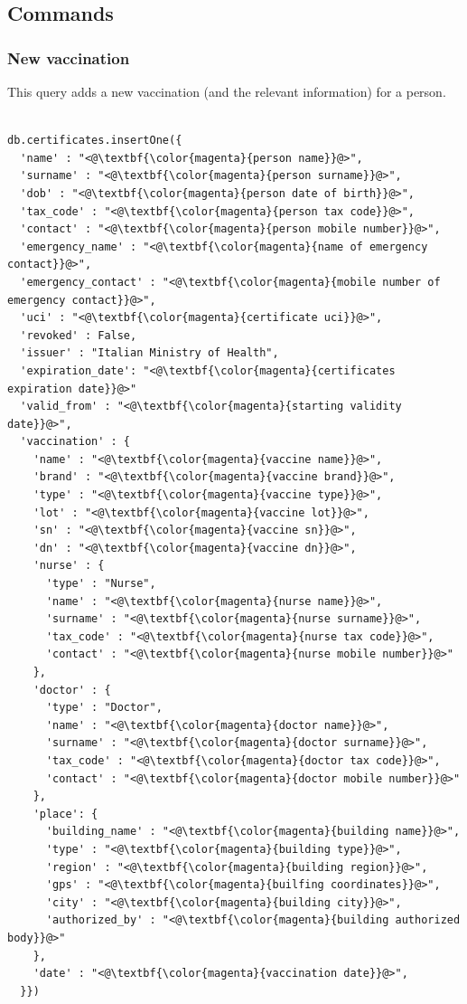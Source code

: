 \documentclass{article}
\begin{document}
\subsection{Commands}
\subsubsection{New vaccination}
This query adds a new vaccination (and the relevant information) for a person.

\begin{lstlisting}[language=cypher, label=lst:cypher-example]

db.certificates.insertOne({
  'name' : "<@\textbf{\color{magenta}{person name}}@>",
  'surname' : "<@\textbf{\color{magenta}{person surname}}@>",
  'dob' : "<@\textbf{\color{magenta}{person date of birth}}@>",
  'tax_code' : "<@\textbf{\color{magenta}{person tax code}}@>",
  'contact' : "<@\textbf{\color{magenta}{person mobile number}}@>",
  'emergency_name' : "<@\textbf{\color{magenta}{name of emergency contact}}@>",
  'emergency_contact' : "<@\textbf{\color{magenta}{mobile number of emergency contact}}@>",
  'uci' : "<@\textbf{\color{magenta}{certificate uci}}@>",
  'revoked' : False,
  'issuer' : "Italian Ministry of Health",
  'expiration_date': "<@\textbf{\color{magenta}{certificates expiration date}}@>"
  'valid_from' : "<@\textbf{\color{magenta}{starting validity date}}@>",
  'vaccination' : {
    'name' : "<@\textbf{\color{magenta}{vaccine name}}@>",
    'brand' : "<@\textbf{\color{magenta}{vaccine brand}}@>",
    'type' : "<@\textbf{\color{magenta}{vaccine type}}@>",
    'lot' : "<@\textbf{\color{magenta}{vaccine lot}}@>",
    'sn' : "<@\textbf{\color{magenta}{vaccine sn}}@>",
    'dn' : "<@\textbf{\color{magenta}{vaccine dn}}@>",
    'nurse' : {
      'type' : "Nurse",
      'name' : "<@\textbf{\color{magenta}{nurse name}}@>",
      'surname' : "<@\textbf{\color{magenta}{nurse surname}}@>",
      'tax_code' : "<@\textbf{\color{magenta}{nurse tax code}}@>",
      'contact' : "<@\textbf{\color{magenta}{nurse mobile number}}@>"
    },
    'doctor' : {
      'type' : "Doctor",
      'name' : "<@\textbf{\color{magenta}{doctor name}}@>",
      'surname' : "<@\textbf{\color{magenta}{doctor surname}}@>",
      'tax_code' : "<@\textbf{\color{magenta}{doctor tax code}}@>",
      'contact' : "<@\textbf{\color{magenta}{doctor mobile number}}@>"
    },
    'place': {
      'building_name' : "<@\textbf{\color{magenta}{building name}}@>",
      'type' : "<@\textbf{\color{magenta}{building type}}@>",
      'region' : "<@\textbf{\color{magenta}{building region}}@>",
      'gps' : "<@\textbf{\color{magenta}{builfing coordinates}}@>",
      'city' : "<@\textbf{\color{magenta}{building city}}@>",
      'authorized_by' : "<@\textbf{\color{magenta}{building authorized body}}@>"
    },
    'date' : "<@\textbf{\color{magenta}{vaccination date}}@>",
  }})

\end{lstlisting}
\end{document}
